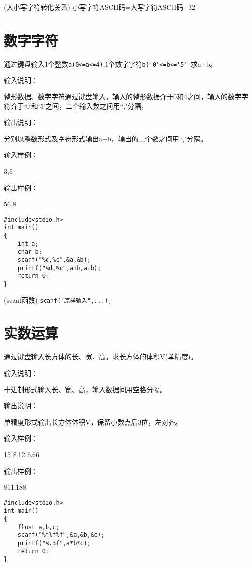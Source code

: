 \begin{note}(大小写字符转化关系)
	小写字符ASCII码=大写字符ASCII码+32
\end{note}

\section{数字字符}
通过键盘输入1个整数\lstinline|a(0<=a<=4)|,1个数字字符\lstinline|b('0'<=b<='5')|求a+b。

输入说明：

整形数据、数字字符通过键盘输入，输入的整形数据介于0和4之间，输入的数字字符介于`0'和`5'之间，二个输入数之间用``,"分隔。

输出说明：

分别以整数形式及字符形式输出a+b，输出的二个数之间用``,"分隔。

输入样例：

3,5

输出样例：

56,8

\begin{lstlisting}
#include<stdio.h>    
int main()                   
{  
	int a;
	char b;
	scanf("%d,%c",&a,&b);
	printf("%d,%c",a+b,a+b); 
	return 0;           
}             
\end{lstlisting}

\begin{note}(scanf函数)
	\lstinline|scanf("原样输入",...);|
\end{note}

\section{实数运算}
通过键盘输入长方体的长、宽、高，求长方体的体积V(单精度)。

输入说明：

十进制形式输入长、宽、高，输入数据间用空格分隔。

输出说明：

单精度形式输出长方体体积V，保留小数点后3位，左对齐。

输入样例：

15  8.12  6.66

输出样例：

811.188


\begin{lstlisting}
#include<stdio.h>   
int main()                   
{  
	float a,b,c;
	scanf("%f%f%f",&a,&b,&c);
	printf("%.3f",a*b*c); 
	return 0;           
}                  
\end{lstlisting}
